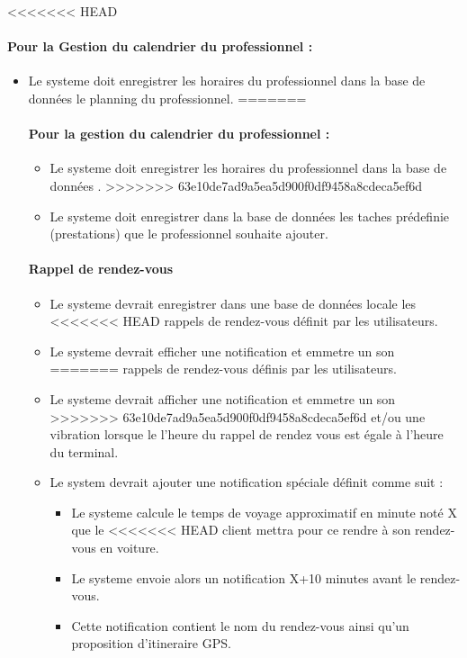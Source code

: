 \documentclass{article}
\begin{document}
\begin{itemize}
\begin{itemize}
<<<<<<< HEAD
\paragraph{Pour la Gestion du calendrier du professionnel :}
\begin{itemize}
\item Le systeme doit enregistrer les horaires du professionnel dans
  la base de données le planning du professionnel.
=======
\paragraph{Pour la gestion du calendrier du professionnel :}
\begin{itemize}
\item Le systeme doit enregistrer les horaires du professionnel dans
  la base de données .
>>>>>>> 63e10de7ad9a5ea5d900f0df9458a8cdeca5ef6d
\item Le systeme doit enregistrer dans la base de données les taches
  prédefinie (prestations) que le professionnel souhaite ajouter.
\end{itemize}

\paragraph{Rappel de rendez-vous}
\begin{itemize}
\item Le systeme devrait enregistrer dans une base de données locale les
<<<<<<< HEAD
  rappels de rendez-vous définit par les utilisateurs.
\item Le systeme devrait efficher une notification et emmetre un son
=======
  rappels de rendez-vous définis par les utilisateurs.
\item Le systeme devrait afficher une notification et emmetre un son
>>>>>>> 63e10de7ad9a5ea5d900f0df9458a8cdeca5ef6d
  et/ou une vibration lorsque le l'heure du rappel de rendez vous est
  égale à l'heure du terminal.
\item Le system devrait ajouter une notification spéciale définit
  comme suit :
  \begin{itemize}
    \item Le systeme calcule le temps de voyage approximatif en minute
      noté X que le
<<<<<<< HEAD
      client mettra pour ce rendre à son rendez-vous en voiture.
     \item Le systeme envoie alors un notification X+10 minutes avant
       le rendez-vous.
     \item Cette notification contient le nom du rendez-vous ainsi
       qu'un proposition d'itineraire GPS.
  \end{itemize}


\end{itemize}
\end{itemize}
\end{itemize}
\end{itemize}
\end{document}
